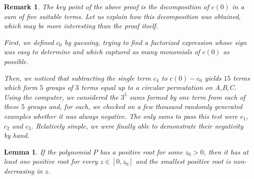 \documentclass[11pt]{article}
\newtheorem{lemma}{Lemma}
\newtheorem{remark}{Remark}
\begin{document}
\begin{remark}
The key point of the above proof is the decomposition of $c(0)$ in a sum of five suitable terms.
Let us explain how this decomposition was obtained, which may be more interesting than the proof itself.

First, we defined $c_0$ by guessing, trying to find a factorized expression whose sign was easy to determine and which captured as many monomials of $c(0)$ as possible.

Then, we noticed that subtracting the single term $c_4$ to $c(0)-c_0$ yields $15$ terms which form $5$ groups of $3$ terms equal up to a circular permutation on A,B,C.
Using the computer, we considered the $3^5$ sums formed by one term from each of these $5$ groups and, for each, we checked on a few thousand randomly generated examples whether it was always negative.
The only sums to pass this test were $c_1$, $c_2$ and $c_3$.
Relatively simple, we were finally able to demonstrate their negativity by hand.
\end{remark}

\begin{lemma}
\label{lem:increasing_radius}
If the polynomial $P$ has a positive root for some $z_0>0$,
then it has at least one positive root for every $z\in[0,z_0]$
and the smallest positive root is non-decreasing in $z$.
\end{lemma}
\end{document}
